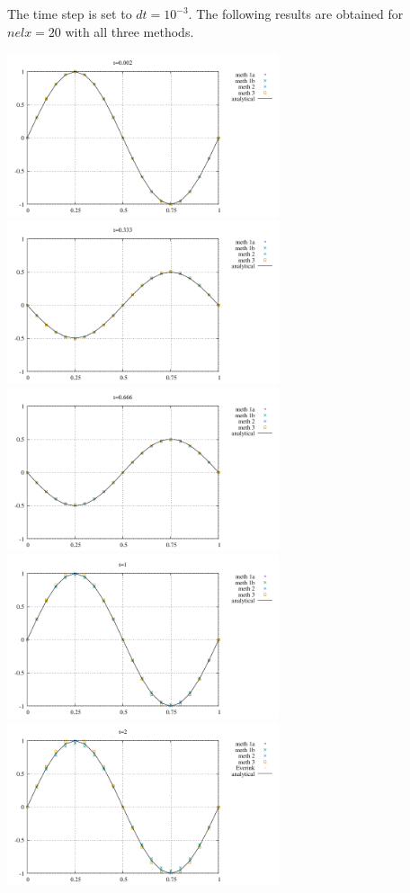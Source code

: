 The time step is set to $dt=10^{-3}$. 
The following results are obtained for $nelx=20$ with all three methods.

\begin{center}
\includegraphics[width=8cm]{python_codes/fieldstone_164/results1/u_0.pdf}
\includegraphics[width=8cm]{python_codes/fieldstone_164/results1/u_1.pdf}\\
\includegraphics[width=8cm]{python_codes/fieldstone_164/results1/u_2.pdf}
\includegraphics[width=8cm]{python_codes/fieldstone_164/results1/u_3.pdf}\\
\includegraphics[width=8cm]{python_codes/fieldstone_164/results1/u_4.pdf}

\end{center}
